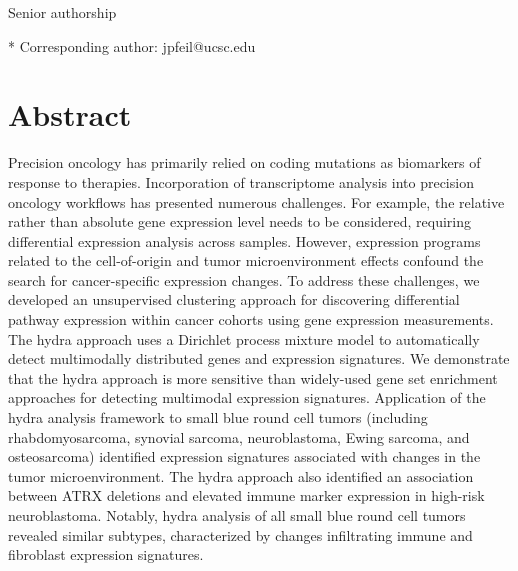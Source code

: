 \documentclass[10pt,letterpaper]{article}
\begin{document}
\begin{flushleft}
% 
%

\ddag Senior authorship




* Corresponding author: jpfeil@ucsc.edu

\end{flushleft}
\section*{Abstract}
Precision oncology has primarily relied on coding mutations as biomarkers of response to therapies. Incorporation of transcriptome analysis into precision oncology workflows has presented numerous challenges. For example, the relative rather than absolute gene expression level needs to be considered, requiring differential expression analysis across samples. However, expression programs related to the cell-of-origin and tumor microenvironment effects confound the search for cancer-specific expression changes. To address these challenges, we developed an unsupervised clustering approach for discovering differential pathway expression within cancer cohorts using gene expression measurements. The hydra approach uses a Dirichlet process mixture model to automatically detect multimodally distributed genes and expression signatures. We demonstrate that the hydra approach is more sensitive than widely-used gene set enrichment approaches for detecting multimodal expression signatures. Application of the hydra analysis framework to small blue round cell tumors (including rhabdomyosarcoma, synovial sarcoma, neuroblastoma, Ewing sarcoma, and osteosarcoma) identified expression signatures associated with changes in the tumor microenvironment. The hydra approach also identified an association between ATRX deletions and elevated immune marker expression in high-risk neuroblastoma. Notably, hydra analysis of all small blue round cell tumors revealed similar subtypes, characterized by changes infiltrating immune and fibroblast expression signatures. 
\end{document}
